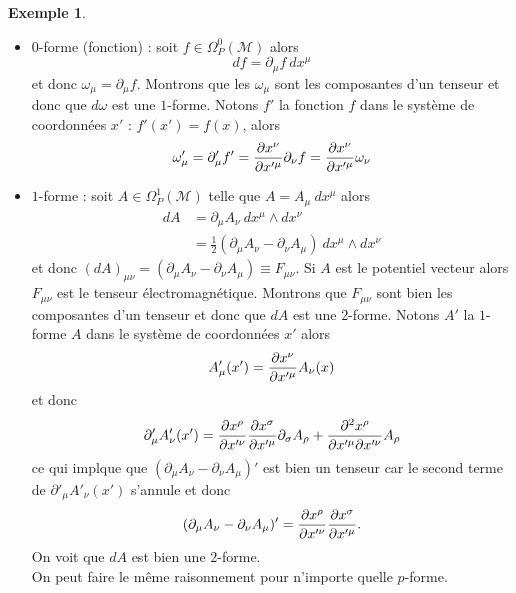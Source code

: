 \documentclass[a4paper,11pt]{report}
\theoremstyle{definition}
\theoremstyle{plain}
\theoremstyle{definition}
\newtheorem{exmp}{Exemple}[chapter]
\theoremstyle{remark}
\newcommand{\M}{\mathscr{M}}
\newcommand{\p}{\partial}
\begin{document}
            \begin{exmp}${}$
                \begin{itemize}[label = \textbullet]
                    \item $0$-forme (fonction) : soit $f\in\Omega_P^0(\M)$ alors 
                        \begin{equation}
                            df = \p_\mu f ~dx^\mu
                        \end{equation}
                        et donc $\omega_\mu = \p_\mu f$. Montrons que les $\omega_\mu$ sont les composantes d'un tenseur et donc que $d\omega$ est une $1$-forme. Notons $f'$ la fonction $f$ dans le système de coordonnées $x'$ : $f'(x') = f(x)$, alors
                        \begin{equation}
                            \omega'_\mu = \p'_\mu f' = \pdv{x^\nu}{x'^\mu}\p_{\nu}f = \pdv{x^\nu}{x'^\mu} \omega_\nu
                        \end{equation}
                    \item $1$-forme : soit $A\in\Omega_P^1(\M)$ telle que $A=A_\mu~dx^\mu$ alors
                        \begin{align}
                            dA &= \p_\mu A_\nu~dx^\mu\wedge dx^\nu\\
                            &= \frac{1}{2} (\p_\mu A_\nu-\p_\nu A_\mu)~dx^\mu\wedge dx^\nu
                        \end{align}
                        et donc $(dA)_{\mu\nu} = (\p_\mu A_\nu-\p_\nu A_\mu)\equiv F_{\mu\nu}$. Si $A$ est le potentiel vecteur alors $F_{\mu\nu}$ est le tenseur électromagnétique. Montrons que $F_{\mu\nu}$ sont bien les composantes d'un tenseur et donc que $dA$ est une $2$-forme. Notons $A'$ la $1$-forme $A$ dans le système de coordonnées $x'$ alors 
                        \begin{equation}
                            A'_\mu(x') = \pdv{x^\nu}{x'^\mu} A_\nu(x)
                        \end{equation}
                        et donc 
                        \begin{equation}
                            \p'_\mu A'_\nu(x') = \pdv{x^\rho}{x'^\nu}\pdv{x^\sigma}{x'^\mu}\p_\sigma A_\rho + \pdv{x^\rho}{x'^\mu}{x'^\nu} A_\rho
                        \end{equation}
                        ce qui implque que $(\p_\mu A_\nu-\p_\nu A_\mu)'$ est bien un tenseur car le second terme de $\p'_\mu A'_\nu(x')$ s'annule et donc
                        \begin{equation}
                            (\p_\mu A_\nu-\p_\nu A_\mu)' = \pdv{x^\rho}{x'^\nu}\pdv{x^\sigma}{x'^\mu}(\p_\sigma A_\rho-\p_\rho A_\sigma).
                        \end{equation}
                        On voit que $dA$ est bien une $2$-forme.\\
                        
                        On peut faire le même raisonnement pour n'importe quelle $p$-forme.
                \end{itemize}
            \end{exmp}
            
\end{document}
